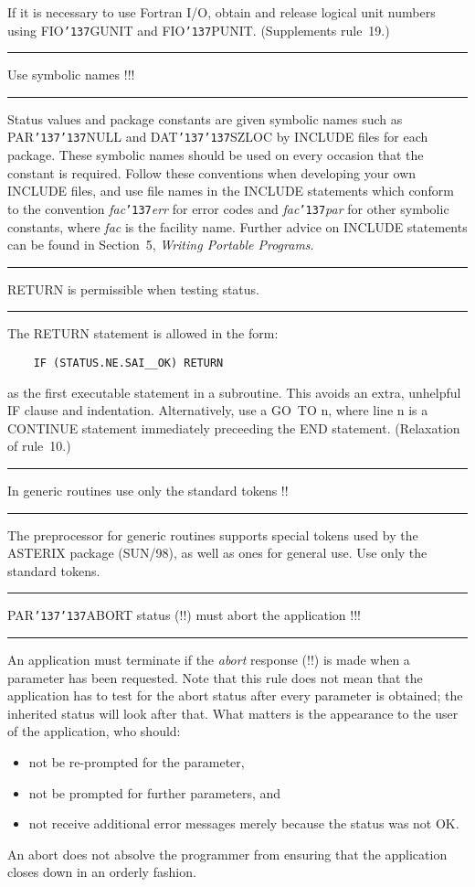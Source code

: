 \documentclass[twoside,11pt]{article}
\newcounter{sruleno}
\newcommand{\srule}[1]{
    \addtocounter{sruleno}{1}
    \goodbreak
    \rule[0.5ex]{\textwidth}{0.3mm}
    {\Large #1 \hfill {\thesruleno}}
    \rule[0.5ex]{\textwidth}{0.1mm}
}
\newcommand{\srule}[1]{
       \addtocounter{sruleno}{1}
       \begin{rawhtml} <HR> \end{rawhtml}
       {\Large \thesruleno}~~~~{\Large #1}
       \begin{rawhtml} <HR> \end{rawhtml}
       \end{tabular}
  }
\renewcommand{\_}{{\tt\char'137}}
\begin{document}
If it is necessary to use Fortran I/O, obtain and release logical unit numbers
using FIO\_GUNIT and FIO\_PUNIT. 
(Supplements rule~19.)

\srule{Use symbolic names !!!}
Status values and package constants are given symbolic names such as
PAR\_\_NULL and DAT\_\_SZLOC by INCLUDE files for each package. 
These symbolic names should be used on every occasion that the constant is
required.  Follow these conventions when developing your own
INCLUDE files, and use file names in the INCLUDE statements
which conform to the convention {\it fac}\_{\it err} for
error codes and {\it fac}\_{\it par} for other symbolic
constants, where {\it fac} is the facility name.  Further
advice on INCLUDE statements can be found in Section~5, {\it Writing
Portable Programs}.

\srule{RETURN is permissible when testing status.}
The RETURN statement is allowed in the form:
\begin{verbatim}
    IF (STATUS.NE.SAI__OK) RETURN
\end{verbatim}
as the first executable statement in a subroutine. 
This avoids an extra, unhelpful IF clause and indentation.
Alternatively, use a GO~TO n, where line n is a CONTINUE statement immediately
preceeding the END statement.
(Relaxation of rule~10.)

\srule{In generic routines use only the standard tokens !!}
The preprocessor for
generic routines supports special tokens used by the \mbox{ASTERIX}
package (SUN/98), as well
as ones for general use.  Use only the standard tokens.

\srule{PAR\_\_ABORT status (!!) must abort the application !!!}
An application must terminate if the {\it abort} response (!!) is
made when a parameter has been requested.  Note that this rule
does not mean that the application has to test for the abort
status after every parameter is obtained;  the inherited
status will look after that.  What matters is the appearance to the
user of the application, who should:
\begin{itemize}
\item not be re-prompted for the parameter,
\item not be prompted for further parameters, and
\item not receive additional error messages merely because
the status was not OK.
\end{itemize}
An abort does not absolve the programmer from ensuring that the
application closes down in an orderly fashion.
\end{document}
